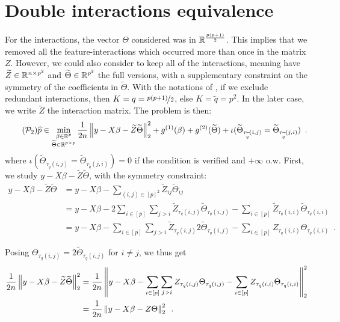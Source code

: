 \documentclass[../main.tex]{subfiles}
\begin{document}
\chapter{Double interactions equivalence}\label{chap:an_double_equiv}


For the interactions, the vector $\Theta$ considered was
in $\mathbb{R}^{\frac{p(p+1)}{2}}$.
This implies that we removed all the feature-interactions which occurred more
than once in the matrix $Z$.
However, we could also consider to keep all of the interactions,
meaning have $\widetilde Z\in\mathbb{R}^{n\times p^2}$ and
$\widetilde\Theta\in\mathbb{R}^{p^2}$
the full versions, with a supplementary constraint on the symmetry of the
coefficients in $\widetilde\Theta$.
With the notations of , if we exclude redundant interactions,
then $K=q=\nicefrac{p(p+1)}{2}$, else
$K=\widetilde q=p^2$. In the later case, we write $\widetilde Z$ the interaction
matrix. The problem is then:
\begin{equation}\label{eq:full}  \tag{$\cP_2$}
\widehat{p}
	\in \min_{\substack{\beta \in \bbR^p \\
	 				   \widetilde \Theta \in \bbR^{p\times p}}}
	\frac{1}{2n}\norm{y - X\beta - \widetilde Z\widetilde \Theta}_2^2 +
	g^{(1)}(\beta) + g^{(2)}(\widetilde \Theta) +
	\iota(\widetilde \Theta_{\tau_{\widetilde q}(i,j)}
	= \widetilde \Theta_{\tau_{\widetilde q}(j,i)}) \enspace.
\end{equation}
%
where $\iota(\widetilde \Theta_{\tau_{\widetilde q}(i,j)}=
	   \widetilde \Theta_{\tau_{\widetilde q}(j,i)}) = 0$
if the condition is verified and $+\infty$ o.w.
First, we study $y - X\beta - \widetilde Z\widetilde \Theta$, with
the symmetry constraint:
\begin{align*}
	y - X\beta - \widetilde Z\widetilde \Theta
	& = y - X\beta - \sum_{(i,j)\in [p]^2}
		\widetilde Z_{ij} \widetilde \Theta_{ij} \\
	& = y - X\beta - 2\sum_{i\in[p]}\sum_{j>i}
		\widetilde Z_{\tau_q(i,j)}
		\widetilde \Theta_{\tau_q(i,j)} -
			\sum_{i\in [p]} \widetilde Z_{\tau_q(i,i)}
			\widetilde \Theta_{\tau_q(i,i)} \\
	& = y - X\beta - \sum_{i\in[p]}\sum_{j>i}
		\widetilde Z_{\tau_q(i,j)} 2\widetilde \Theta_{\tau_q(i,j)} -
			\sum_{i\in [p]} Z_{\tau_q(i,i)} \Theta_{\tau_q(i,i)}
			\enspace.
\end{align*}

Posing $\Theta_{\tau_q(i,j)} = 2 \widetilde\Theta_{\tau_q(i,j)}$
for $i\neq j$, we thus get
\begin{align*}
	\frac{1}{2n}\left \lVert y - X\beta - \widetilde Z\widetilde \Theta \right \rVert_2^2 &
	= \frac{1}{2n}\left \lVert y - X\beta -
		\sum_{i\in[p]}\sum_{j>i} Z_{\tau_q(i,j)} \Theta_{\tau_q(i,j)} -
		\sum_{i\in [p]} Z_{\tau_q(i,i)} \Theta_{\tau_q(i,i)} \right \rVert_2^2 \\
	&= \frac{1}{2n}\left \lVert y - X\beta - Z \Theta \right \rVert_2^2 \enspace.
\end{align*}
\end{document}
